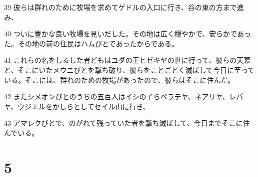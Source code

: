 \par 39 彼らは群れのために牧場を求めてゲドルの入口に行き、谷の東の方まで進み、
\par 40 ついに豊かな良い牧場を見いだした。その地は広く穏やかで、安らかであった。その地の前の住民はハムびとであったからである。
\par 41 これらの名をしるした者どもはユダの王ヒゼキヤの世に行って、彼らの天幕と、そこにいたメウニびとを撃ち破り、彼らをことごとく滅ぼして今日に至っている。そこには、群れのための牧場があったので、彼らはそこに住んだ。
\par 42 またシメオンびとのうちの五百人はイシの子らペラテヤ、ネアリヤ、レパヤ、ウジエルをかしらとしてセイル山に行き、
\par 43 アマレクびとで、のがれて残っていた者を撃ち滅ぼして、今日までそこに住んでいる。

\chapter{5}

